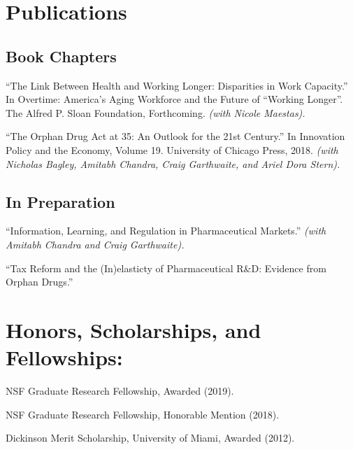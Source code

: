 \documentclass[letterpaper]{article}
\renewenvironment{itemize}{
  \begin{list}{}{
    \setlength{\leftmargin}{1.5em}
  }
}{
  \end{list}
}
\begin{document}
\section*{Publications}

\subsection*{Book Chapters}

\begin{itemize}
	\item ``The Link Between Health and Working Longer: Disparities in Work Capacity.'' In Overtime: America's Aging Workforce and the Future of ``Working Longer''. The Alfred P. Sloan Foundation, Forthcoming. \textit{(with Nicole Maestas).}
	
	\item ``The Orphan Drug Act at 35: An Outlook for the 21st Century.'' In Innovation Policy and the Economy, Volume 19. University of Chicago Press, 2018. \textit{(with Nicholas Bagley, Amitabh Chandra, Craig Garthwaite, and Ariel Dora Stern).}
\end{itemize}

\subsection*{In Preparation}
\begin{itemize}
	\item ``Information, Learning, and Regulation in Pharmaceutical Markets.'' \textit{(with Amitabh Chandra and Craig Garthwaite).}
	
	\item ``Tax Reform and the (In)elasticty of Pharmaceutical R\&D: Evidence from Orphan Drugs.''
\end{itemize}

\section*{Honors, Scholarships, and Fellowships:}
\begin{itemize}
	\item NSF Graduate Research Fellowship, Awarded (2019).
	\item NSF Graduate Research Fellowship, Honorable Mention (2018).
	\item Dickinson Merit Scholarship, University of Miami, Awarded (2012).
\end{itemize}

%
\end{document}
